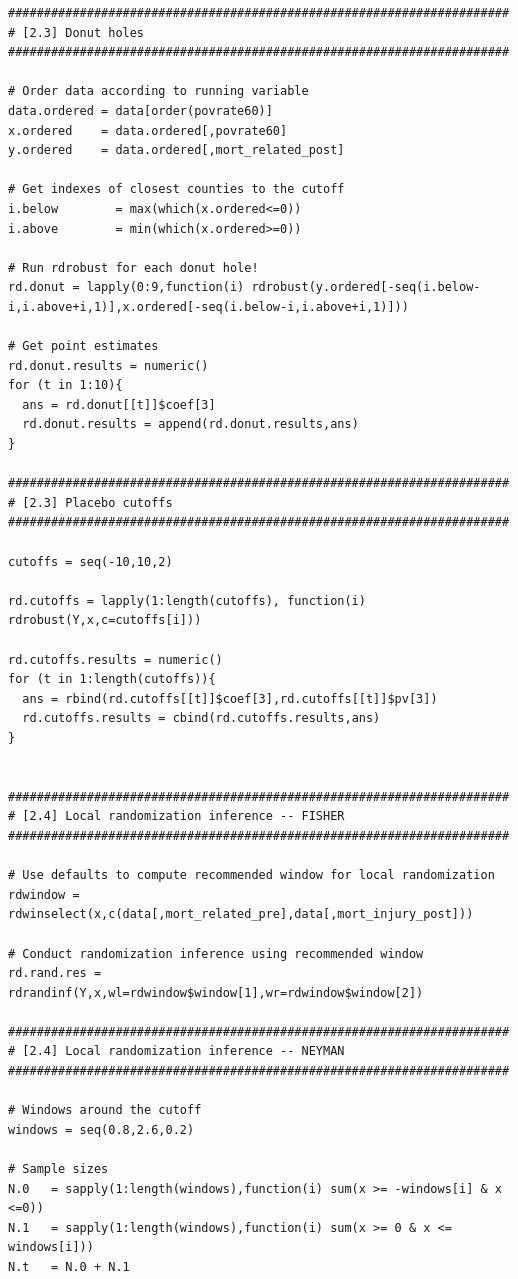 \documentclass[12pt]{article}
\begin{document}
\begin{verbatim}
######################################################################
# [2.3] Donut holes
######################################################################

# Order data according to running variable
data.ordered = data[order(povrate60)]
x.ordered    = data.ordered[,povrate60]
y.ordered    = data.ordered[,mort_related_post]

# Get indexes of closest counties to the cutoff
i.below        = max(which(x.ordered<=0))
i.above        = min(which(x.ordered>=0))

# Run rdrobust for each donut hole!
rd.donut = lapply(0:9,function(i) rdrobust(y.ordered[-seq(i.below-i,i.above+i,1)],x.ordered[-seq(i.below-i,i.above+i,1)]))

# Get point estimates
rd.donut.results = numeric()
for (t in 1:10){
  ans = rd.donut[[t]]$coef[3]
  rd.donut.results = append(rd.donut.results,ans)
}

######################################################################
# [2.3] Placebo cutoffs
######################################################################

cutoffs = seq(-10,10,2)

rd.cutoffs = lapply(1:length(cutoffs), function(i) rdrobust(Y,x,c=cutoffs[i]))

rd.cutoffs.results = numeric()
for (t in 1:length(cutoffs)){
  ans = rbind(rd.cutoffs[[t]]$coef[3],rd.cutoffs[[t]]$pv[3])
  rd.cutoffs.results = cbind(rd.cutoffs.results,ans)
}


######################################################################
# [2.4] Local randomization inference -- FISHER
######################################################################

# Use defaults to compute recommended window for local randomization
rdwindow = rdwinselect(x,c(data[,mort_related_pre],data[,mort_injury_post]))

# Conduct randomization inference using recommended window
rd.rand.res = rdrandinf(Y,x,wl=rdwindow$window[1],wr=rdwindow$window[2])

######################################################################
# [2.4] Local randomization inference -- NEYMAN
######################################################################

# Windows around the cutoff
windows = seq(0.8,2.6,0.2)

# Sample sizes
N.0   = sapply(1:length(windows),function(i) sum(x >= -windows[i] & x <=0))
N.1   = sapply(1:length(windows),function(i) sum(x >= 0 & x <= windows[i]))
N.t   = N.0 + N.1


\end{verbatim}
\end{document}
